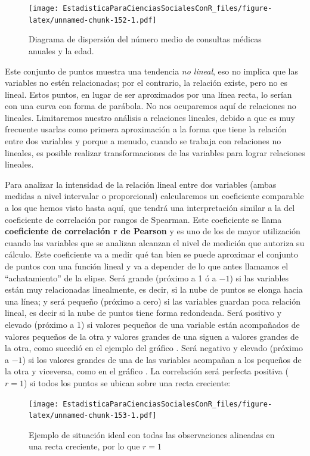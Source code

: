 \documentclass[]{book}
\begin{document}
\begin{figure}
\centering
\texttt{[image: EstadisticaParaCienciasSocialesConR\_files/figure-latex/unnamed-chunk-152-1.pdf]}
\caption{\label{fig:unnamed-chunk-152}Diagrama de dispersión del número medio de consultas médicas anuales y la edad.}
\end{figure}

Este conjunto de puntos muestra una tendencia \emph{no lineal}, eso no
implica que las variables no estén relacionadas; por el contrario, la
relación existe, pero no es lineal. Estos puntos, en lugar de ser
aproximados por una línea recta, lo serían con una curva con forma de
parábola. No nos ocuparemos aquí de relaciones no lineales. Limitaremos
nuestro análisis a relaciones lineales, debido a que es muy frecuente
usarlas como primera aproximación a la forma que tiene la relación entre
dos variables y porque a menudo, cuando se trabaja con relaciones no
lineales, es posible realizar transformaciones de las variables para
lograr relaciones lineales.

Para analizar la intensidad de la relación lineal entre dos variables
(ambas medidas a nivel intervalar o proporcional) calcularemos un
coeficiente comparable a los que hemos visto hasta aquí, que tendrá una
interpretación similar a la del coeficiente de correlación por rangos de
Spearman. Este coeficiente se llama \textbf{coeficiente de correlación r de Pearson} y es uno de los de mayor utilización cuando las variables que
se analizan alcanzan el nivel de medición que autoriza su cálculo. Este
coeficiente va a medir qué tan bien se puede aproximar el conjunto de
puntos con una función lineal y va a depender de lo que antes llamamos
el ``achatamiento'' de la elipse. Será grande (próximo a 1 ó a \(-1\)) si las
variables están muy relacionadas linealmente, es decir, si la nube de
puntos se elonga hacia una línea; y será pequeño (próximo a cero) si las
variables guardan poca relación lineal, es decir si la nube de puntos
tiene forma redondeada. Será positivo y elevado (próximo a 1) si valores
pequeños de una variable están acompañados de valores pequeños de la
otra y valores grandes de una siguen a valores grandes de la otra, como
sucedió en el ejemplo del gráfico . Será negativo y elevado (próximo a
\(-1\)) si los valores grandes de una de las variables acompañan a los
pequeños de la otra y viceversa, como en el gráfico . La correlación
será perfecta positiva (\(r = 1\)) si todos los puntos se ubican sobre una recta creciente:

\begin{figure}
\centering
\texttt{[image: EstadisticaParaCienciasSocialesConR\_files/figure-latex/unnamed-chunk-153-1.pdf]}
\caption{\label{fig:unnamed-chunk-153}Ejemplo de situación ideal con todas las observaciones alineadas en una recta creciente, por lo que \(r = 1\)}
\end{figure}
\end{document}
